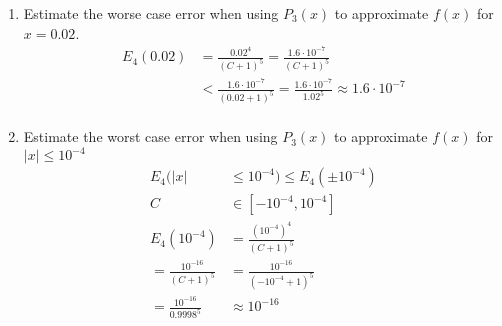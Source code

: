 \documentclass{article}
\begin{document}
\begin{enumerate}[label=(\alph*)]
    \item Estimate the worse case error when using \(P_3(x)\) to approximate \(f(x)\) for \(x = 0.02\).
          \begin{align*}
              E_{4}(0.02) & = \frac{0.02^4}{(C + 1)^5} = \frac{1.6 \cdot 10^{-7}}{(C + 1) ^ 5}                                        \\
                          & < \frac{1.6 \cdot 10^{-7}}{(0.02 + 1) ^ 5} = \frac{1.6 \cdot 10^{-7}}{1.02 ^ 5} \approx 1.6 \cdot 10^{-7} \\
          \end{align*}
    \item Estimate the worst case error when using \(P_3(x)\) to approximate \(f(x)\) for \(\vert x \vert \leq 10^{-4}\)
          \begin{align*}
              E_4(\vert x \vert             & \leq 10^{-4}) \leq E_4(\pm 10^{-4}) \\
              C                             & \in [-10^{-4}, 10^{-4}]             \\
              E_4(10^{-4})                  & = \frac{(10^{-4})^4}{(C + 1)^5}     \\
              = \frac{10^{-16}}{(C + 1)^5}  & = \frac{10^{-16}}{(-10^{-4} + 1)^5} \\
              = \frac{10^{-16}}{0.9998 ^ 5} & \approx 10^{-16}                    \\
          \end{align*}
\end{enumerate}
\end{document}
